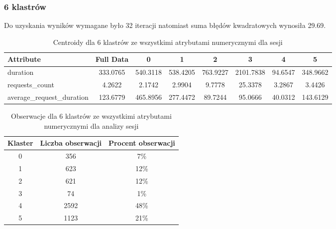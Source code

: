 \documentclass[../EDI_Task1_Karwowski_Kowalewski.tex]{subfiles}
\begin{document}
{{        \subsubsection{6 klastrów} {

            Do uzyskania wyników wymagane było 32 iteracji natomiast suma błędów
            kwadratowych wynosiła 29.69.
            \begin{table}[!htbp]
                \footnotesize
                \centering
                \begin{tabular}{|l|c|c|c|c|c|c|c|}
                    \hline
                    Attribute                 & Full Data &        0 &        1 &        2 &         3  &       4 &        5 \\ \hline
                    duration                  &  333.0765 & 540.3118 & 538.4205 & 763.9227 & 2101.7838  & 94.6547 & 348.9662 \\
                    requests\_count            &    4.2622 &   2.1742 &   2.9904 &   9.7778 &   25.3378  &  3.2867 &   3.4426 \\
                    average\_request\_duration  &  123.6779 & 465.8956 & 277.4472 &  89.7244 &   95.0666  & 40.0312 & 143.6129 \\ \hline
                \end{tabular}
                \caption
                {Centroidy dla 6 klastrów ze wszystkimi atrybutami numerycznymi dla sesji}
                \label{sessions_num_k_6}
            \end{table}

            \begin{table}[!htbp]
                \footnotesize
                \centering
                \begin{tabular}{|c|c|c|}
                    \hline
                    Klaster & Liczba obserwacji & Procent obserwacji \\ \hline
                    0   &    356 &  7\% \\
                    1   &    623 & 12\% \\
                    2   &    621 & 12\% \\
                    3   &     74 &  1\% \\
                    4   &   2592 & 48\% \\
                    5   &   1123 & 21\% \\ \hline
                \end{tabular}
                \caption
                {Obserwacje dla 6 klastrów ze wszystkimi atrybutami numerycznymi dla analizy sesji}
                \label{stats_session_num_k_6}
            \end{table}
            \FloatBarrier

}}}
\end{document}
